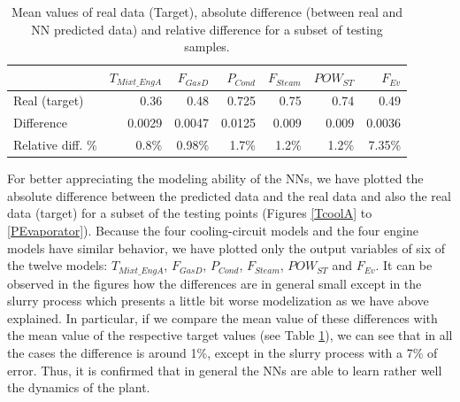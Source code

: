 \begin{table}[!t]
\caption{Mean values of  real data (Target), absolute difference (between real and NN predicted data) and relative difference for a subset of testing samples.}
\label{tbl:diff}
  \centering
\begin{tabular}{lrrrrrr} \toprule
 & $T_{Mixt\_EngA}$ & $F_{GasD}$ & $P_{Cond}$ & $F_{Steam}$ & $POW_{ST}$ & $F_{Ev}$ \\ \midrule
Real (target) & 0.36 & 0.48 & 0.725 & 0.75 & 0.74 & 0.49 \\
Difference  & 0.0029 & 0.0047 & 0.0125 & 0.009 & 0.009 & 0.0036 \\
Relative diff. \%  & 0.8\%  & 0.98\% & 1.7\% & 1.2\% & 1.2\% & 7.35\%\\
 \bottomrule
\end{tabular}
\vspace{-0.3cm}

\end{table}

For better appreciating the modeling ability of the NNs, we have  plotted the absolute difference between the predicted data and the real data and also the real data (target) for a subset of the testing points (Figures \ref{TcoolA} to \ref{PEvaporator}). Because the four cooling-circuit models and the four engine models have similar behavior, we have plotted only the output variables of six of the twelve models: $T_{Mixt\_EngA}$, $F_{GasD}$, $P_{Cond}$, $F_{Steam}$, $POW_{ST}$ and $F_{Ev}$.  It can be observed in the figures how the differences are in general small except in the slurry process  which presents a little bit worse modelization as we have above explained.  In particular, if we compare the mean value of these differences with the mean value of the respective target values (see Table \ref{tbl:diff}), we can see that in all the cases the difference is around 1\%, except in the slurry process with a 7\% of error. Thus, it is confirmed that in general the NNs are able to learn rather well the dynamics of the plant. 




